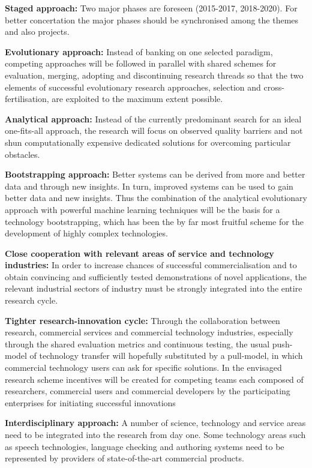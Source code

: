 \documentclass[10pt, plain]{../../metanetpaper}
\begin{document}
\begin{multicols}{2}
\textbf{Staged approach:} Two major phases are foreseen (2015-2017, 2018-2020). For better concertation the major phases should be synchronised among the themes and also projects.   

\textbf{Evolutionary approach:} Instead of banking on one selected paradigm, competing approaches will be followed in parallel with shared schemes for evaluation, merging, adopting and discontinuing research threads so that the two elements of successful evolutionary research approaches, selection and cross-fertilisation, are exploited to the maximum extent possible.

\textbf{Analytical approach:} Instead of the currently predominant search for an ideal one-fits-all approach, the research will focus on observed quality barriers and not shun computationally expensive dedicated solutions for overcoming particular obstacles.

\textbf{Bootstrapping approach:} Better systems can be derived from more and better data and through new insights. In turn, improved systems can be used to gain better data and new insights. Thus the combination of the analytical evolutionary approach with powerful machine learning techniques will be the basis for a technology bootstrapping, which has been the by far most fruitful scheme for the development of highly complex technologies.

\textbf{Close cooperation with relevant areas of service and technology industries:} In order to increase chances of successful commercialisation and to obtain convincing and sufficiently tested demonstrations of novel applications, the relevant industrial sectors of industry must be strongly integrated into the entire research cycle.

\textbf{Tighter research-innovation cycle:} Through the collaboration between research, commercial services and commercial technology industries, especially through the shared evaluation metrics and continuous testing, the usual push-model of technology transfer will hopefully substituted by a pull-model, in which commercial technology users can ask for specific solutions. In the envisaged research scheme incentives will be created for competing teams each composed of researchers, commercial users and commercial developers by the participating enterprises for initiating successful innovations

\textbf{Interdisciplinary approach:} A number of science, technology and service areas need to be integrated into the research from day one. Some technology areas such as speech technologies, language checking and authoring systems need to be represented by providers of state-of-the-art commercial products.


\end{multicols}
\end{document}
